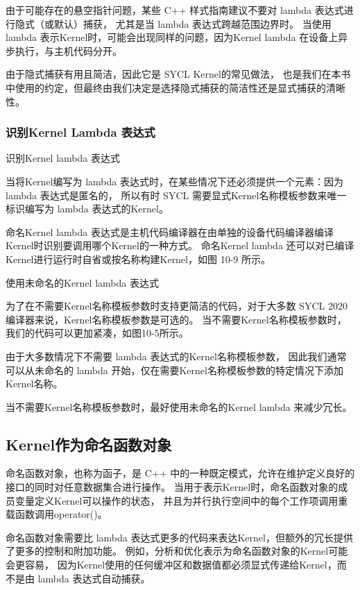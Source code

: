 \begin{remark}
由于可能存在的悬空指针问题，某些 C++ 样式指南建议不要对 lambda 表达式进行隐式（或默认）捕获，
尤其是当 lambda 表达式跨越范围边界时。
当使用 lambda 表示Kernel时，可能会出现同样的问题，因为Kernel lambda 在设备上异步执行，与主机代码分开。

由于隐式捕获有用且简洁，因此它是 SYCL Kernel的常见做法，
也是我们在本书中使用的约定，但最终由我们决定是选择隐式捕获的简洁性还是显式捕获的清晰性。
\end{remark}

\subsubsection{识别Kernel Lambda 表达式}
{\color{red} 识别Kernel lambda 表达式}

当将Kernel编写为 lambda 表达式时，在某些情况下还必须提供一个元素：因为 lambda 表达式是匿名的，
所以有时 SYCL 需要显式Kernel名称模板参数来唯一标识编写为 lambda 表达式的Kernel。

命名Kernel lambda 表达式是主机代码编译器在由单独的设备代码编译器编译Kernel时识别要调用哪个Kernel的一种方式。 
命名Kernel lambda 还可以对已编译Kernel进行运行时自省或按名称构建Kernel，如图 10-9 所示。

{\color{red} 使用未命名的Kernel lambda 表达式}

为了在不需要Kernel名称模板参数时支持更简洁的代码，对于大多数 SYCL 2020 编译器来说，Kernel名称模板参数是可选的。 
当不需要Kernel名称模板参数时，我们的代码可以更加紧凑，如图10-5所示。

由于大多数情况下不需要 lambda 表达式的Kernel名称模板参数，
因此我们通常可以从未命名的 lambda 开始，仅在需要Kernel名称模板参数的特定情况下添加Kernel名称。

\begin{remark}
	当不需要Kernel名称模板参数时，最好使用未命名的Kernel lambda 来减少冗长。
\end{remark}

\subsection{Kernel作为命名函数对象}
命名函数对象，也称为函子，是 C++ 中的一种既定模式，允许在维护定义良好的接口的同时对任意数据集合进行操作。 
当用于表示Kernel时，命名函数对象的成员变量定义Kernel可以操作的状态，
并且为并行执行空间中的每个工作项调用重载函数调用operator()。

命名函数对象需要比 lambda 表达式更多的代码来表达Kernel，但额外的冗长提供了更多的控制和附加功能。 
例如，分析和优化表示为命名函数对象的Kernel可能会更容易，
因为Kernel使用的任何缓冲区和数据值都必须显式传递给Kernel，而不是由 lambda 表达式自动捕获。

